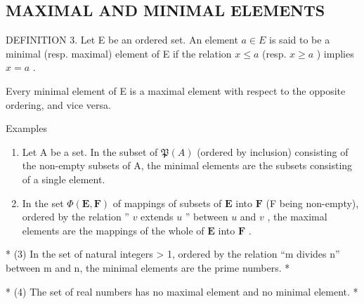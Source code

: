 \subsection{MAXIMAL AND MINIMAL ELEMENTS}

DEFINITION 3. Let E be an ordered set. An element \(a \in E\) is said to be a minimal (resp. maximal) element of E if the relation \(x \leqslant a\) (resp. \(x \geqslant a\) ) implies \(x = a\) .

Every minimal element of E is a maximal element with respect to the opposite ordering, and vice versa.

Examples

\begin{enumerate}
\def\labelenumi{(\arabic{enumi})}
\item
  Let A be a set. In the subset of \(\mathfrak{P}(A)\) (ordered by inclusion) consisting of the non-empty subsets of A, the minimal elements are the subsets consisting of a single element.
\item
  In the set \(\Phi(\mathbf{E},\mathbf{F})\) of mappings of subsets of \(\mathbf{E}\) into \(\mathbf{F}\) (F being non-empty), ordered by the relation '' \(v\) extends \(u\) '' between \(u\) and \(v\) , the maximal elements are the mappings of the whole of \(\mathbf{E}\) into \(\mathbf{F}\) .
\end{enumerate}

* (3) In the set of natural integers \textgreater{} 1, ordered by the relation ``m divides n'' between m and n, the minimal elements are the prime numbers. *

* (4) The set of real numbers has no maximal element and no minimal element. *

